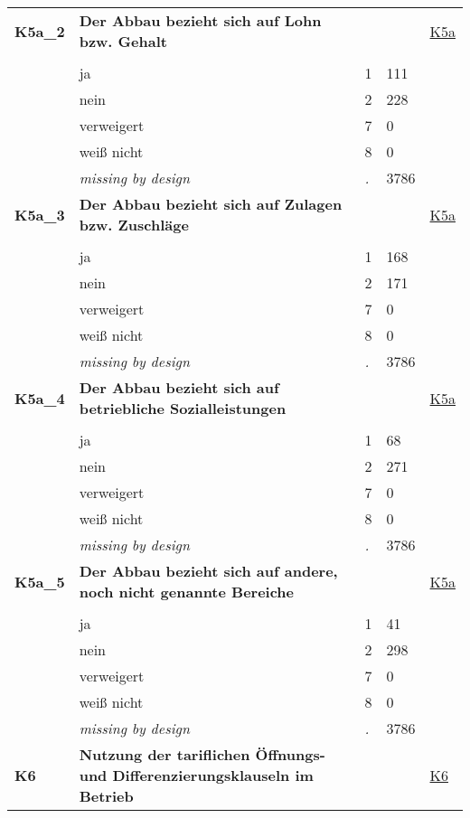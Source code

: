 \begin{longtable}{| L{2.65cm} | L{8cm} | C{1.5cm} | R{1.25cm} | C{2.25cm}  |}
\textbf{K5a\_2}\label{var:K5a:2} & \textbf{Der Abbau bezieht sich auf Lohn  bzw. Gehalt} &  &  & \hyperref[K5a]{K5a} \\ 
   &  &  &  &  \\ 
   & ja & 1 & 111 &  \\ 
   & nein & 2 & 228 &  \\ 
   & verweigert & 7 & 0 &  \\ 
   & weiß nicht & 8 & 0 &  \\ 
   & \textit{missing by design} & \textit{.} & 3786 &  \\ 
   \midrule
\textbf{K5a\_3}\label{var:K5a:3} & \textbf{Der Abbau bezieht sich auf Zulagen bzw. Zuschläge} &  &  & \hyperref[K5a]{K5a} \\ 
   &  &  &  &  \\ 
   & ja & 1 & 168 &  \\ 
   & nein & 2 & 171 &  \\ 
   & verweigert & 7 & 0 &  \\ 
   & weiß nicht & 8 & 0 &  \\ 
   & \textit{missing by design} & \textit{.} & 3786 &  \\ 
   \midrule
\textbf{K5a\_4}\label{var:K5a:4} & \textbf{Der Abbau bezieht sich auf betriebliche Sozialleistungen} &  &  & \hyperref[K5a]{K5a} \\ 
   &  &  &  &  \\ 
   & ja & 1 & 68 &  \\ 
   & nein & 2 & 271 &  \\ 
   & verweigert & 7 & 0 &  \\ 
   & weiß nicht & 8 & 0 &  \\ 
   & \textit{missing by design} & \textit{.} & 3786 &  \\ 
   \midrule
\textbf{K5a\_5}\label{var:K5a:5} & \textbf{Der Abbau bezieht sich auf andere, noch nicht genannte Bereiche} &  &  & \hyperref[K5a]{K5a} \\ 
   &  &  &  &  \\ 
   & ja & 1 & 41 &  \\ 
   & nein & 2 & 298 &  \\ 
   & verweigert & 7 & 0 &  \\ 
   & weiß nicht & 8 & 0 &  \\ 
   & \textit{missing by design} & \textit{.} & 3786 &  \\ 
   \midrule
\textbf{K6}\label{var:K6} & \textbf{Nutzung der tariflichen Öffnungs- und Differenzierungsklauseln im Betrieb} &  &  & \hyperref[K6]{K6} \\ 

\end{longtable}
